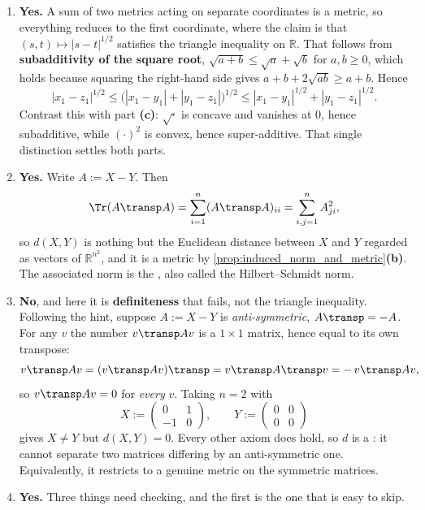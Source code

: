 \begin{exercisesolution}
\begin{enumerate}[label=\textbf{(\alph*)}]
    official hint suggests, and take three collinear points $x := (0,0)$, $y := (1,0)$ and
    $z := (2,0)$:
    \[d(x,z) = 2^2 = 4 \quad > \quad d(x,y) + d(y,z) = 1 + 1 = 2.\]
    Squaring produces the same failure as in
    \cref{ex:metric_axioms_are_needed}\textbf{(c)}: a function growing faster than linearly
    makes one long step more expensive than two short ones.
  \item \textbf{Yes.} A sum of two metrics acting on separate coordinates is a metric, so
    everything reduces to the first coordinate, where the claim is that
    $(s,t) \mapsto |s-t|^{1/2}$ satisfies the triangle inequality on $\mathbb{R}$. That follows
    from \textbf{subadditivity of the square root}, $\sqrt{a+b} \leq \sqrt a + \sqrt b$ for
    $a,b \geq 0$, which holds because squaring the right-hand side gives
    $a+b+2\sqrt{ab} \geq a+b$. Hence
    \[|x_1-z_1|^{1/2} \leq \big(|x_1-y_1| + |y_1-z_1|\big)^{1/2}
      \leq |x_1-y_1|^{1/2} + |y_1-z_1|^{1/2}.\]
    Contrast this with part \textbf{(c)}: $\sqrt{\cdot}$ is concave and vanishes at $0$, hence
    subadditive, while $(\cdot)^2$ is convex, hence super-additive. That single distinction
    settles both parts.
  \item \textbf{Yes.} Write $A := X-Y$. Then
    \[\Tr(A\transp A) = \sum_{i=1}^n (A\transp A)_{ii} = \sum_{i,j=1}^n A_{ji}^2,\]
    so $d(X,Y)$ is nothing but the Euclidean distance between $X$ and $Y$ regarded as vectors of
    $\mathbb{R}^{n^2}$, and it is a metric by
    \cref{prop:induced_norm_and_metric}\textbf{(b)}. The associated norm is the
     , also called the Hilbert--Schmidt norm.
  \item \textbf{No}, and here it is \textbf{definiteness} that fails, not the triangle
    inequality. Following the hint, suppose $A := X-Y$ is \emph{anti-symmetric},
    $A\transp = -A$. For any $v$ the number $v\transp Av$ is a $1\times1$ matrix, hence equal to
    its own transpose:
    \[v\transp A v = (v\transp A v)\transp = v\transp A\transp v = -\,v\transp A v,\]
    so $v\transp Av = 0$ for \emph{every} $v$. Taking $n=2$ with
    \[X := \begin{pmatrix} 0 & 1 \\ -1 & 0\end{pmatrix}, \qquad
      Y := \begin{pmatrix} 0 & 0 \\ 0 & 0\end{pmatrix}\]
    gives $X \neq Y$ but $d(X,Y) = 0$. Every other axiom does hold, so $d$ is a
     : it cannot separate two matrices
    differing by an anti-symmetric one. Equivalently, it restricts to a genuine metric on the
    symmetric matrices.
  \item \textbf{Yes.} Three things need checking, and the first is the one that is easy to skip.


\end{enumerate}
\end{exercisesolution}
